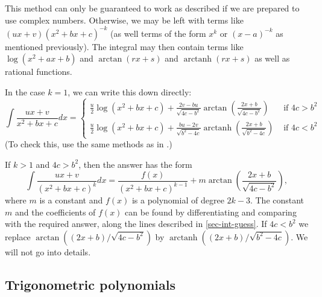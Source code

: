 \documentclass[a4paper]{book}
\newcommand{\arctanh}  {\operatorname{arctanh}}
\renewcommand{\:}{\colon}
\theoremstyle{definition}
\begin{document}
This method can only be guaranteed to work as described if we are
prepared to use complex numbers.  Otherwise, we may be left with terms
like $(ux+v)(x^2+bx+c)^{-k}$ (as well terms of the form $x^k$ or
$(x-a)^{-k}$ as mentioned previously).  The integral may then contain
terms like $\log(x^2+ax+b)$ and $\arctan(rx+s)$ and $\arctanh(rx+s)$
as well as rational functions.

In the case $k=1$, we can write this down directly:
\[ \int \frac{ux+v}{x^2+bx+c} dx = 
  \begin{cases} \frac{u}{2}\log(x^2+bx+c) + 
                \frac{2v-bu}{\sqrt{4c-b^2}}
                \arctan\left(\frac{2x+b}{\sqrt{4c-b^2}}\right) &
                 \text{ if } 4c > b^2 \\
                \frac{u}{2}\log(x^2+bx+c) + 
                \frac{bu-2v}{\sqrt{b^2-4c}}
                \arctanh\left(\frac{2x+b}{\sqrt{b^2-4c}}\right) &
                 \text{ if } 4c < b^2
  \end{cases} 
\]
(To check this, use the same methods as in .)

If $k>1$ and $4c>b^2$, then the answer has the form
\[ \int\frac{ux+v}{(x^2+bx+c)^k} dx = 
    \frac{f(x)}{(x^2+bx+c)^{k-1}} + 
    m \arctan\left(\frac{2x+b}{\sqrt{4c-b^2}}\right),
\]
where $m$ is a constant and $f(x)$ is a polynomial of degree $2k-3$.
The constant $m$ and the coefficients of $f(x)$ can be found by
differentiating and comparing with the required answer, along the
lines described in \autoref{sec-int-guess}.  If $4c<b^2$ we
replace $\arctan((2x+b)/\sqrt{4c-b^2})$ by
$\arctanh((2x+b)/\sqrt{b^2-4c})$.  We will not go into details. 

\subsection{Trigonometric polynomials}
\end{document}
